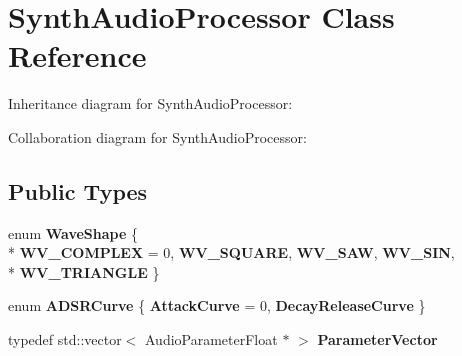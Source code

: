 \hypertarget{class_synth_audio_processor}{}\section{Synth\+Audio\+Processor Class Reference}
\label{class_synth_audio_processor}


Inheritance diagram for Synth\+Audio\+Processor\+:


Collaboration diagram for Synth\+Audio\+Processor\+:
\subsection*{Public Types}
\begin{DoxyCompactItemize}
\item 
enum {\bfseries Wave\+Shape} \{ \\*
{\bfseries W\+V\+\_\+\+C\+O\+M\+P\+L\+EX} = 0, 
{\bfseries W\+V\+\_\+\+S\+Q\+U\+A\+RE}, 
{\bfseries W\+V\+\_\+\+S\+AW}, 
{\bfseries W\+V\+\_\+\+S\+IN}, 
\\*
{\bfseries W\+V\+\_\+\+T\+R\+I\+A\+N\+G\+LE}
 \}\hypertarget{class_synth_audio_processor_af5cd9f02a81cec98ebc7329f3732d1f2}{}\label{class_synth_audio_processor_af5cd9f02a81cec98ebc7329f3732d1f2}

\item 
enum {\bfseries A\+D\+S\+R\+Curve} \{ {\bfseries Attack\+Curve} = 0, 
{\bfseries Decay\+Release\+Curve}
 \}\hypertarget{class_synth_audio_processor_a708e08bff3707ba6db3ec81687d5e911}{}\label{class_synth_audio_processor_a708e08bff3707ba6db3ec81687d5e911}

\item 
typedef std\+::vector$<$ Audio\+Parameter\+Float $\ast$ $>$ {\bfseries Parameter\+Vector}\hypertarget{class_synth_audio_processor_a7781964bd192439b7bd0dbcb9b26ee5b}{}\label{class_synth_audio_processor_a7781964bd192439b7bd0dbcb9b26ee5b}

\end{DoxyCompactItemize}
